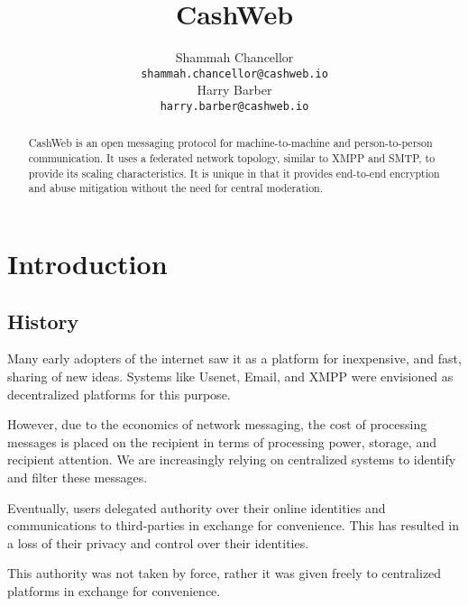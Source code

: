 \documentclass{article}
\title{CashWeb}
\author{
  Shammah Chancellor \\
  \texttt{shammah.chancellor@cashweb.io} \\
  \And
  Harry Barber \\
  \texttt{harry.barber@cashweb.io} \\
}
\theoremstyle{definition}
\begin{document}
\maketitle

\begin{abstract}
CashWeb is an open messaging protocol for machine-to-machine and person-to-person communication. It uses a federated network topology, similar to XMPP and SMTP, to provide its scaling characteristics. It is unique in that it provides end-to-end encryption and abuse mitigation without the need for central moderation.
\end{abstract}

\section{Introduction}

\subsection{History}

Many early adopters of the internet saw it as a platform for inexpensive, and fast, sharing of new ideas. Systems like Usenet\cite{rfc5536}\cite{rfc5537}, Email\cite{rfc5322}\cite{rfc1939}\cite{rfc5321}\cite{rfc4551}, and XMPP\cite{rfc3920}\cite{rfc3921}\cite{rfc3922}\cite{rfc3923} were envisioned as decentralized platforms for this purpose.


However, due to the economics of network messaging, the cost of processing messages is placed on the recipient in terms of processing power, storage, and recipient attention. We are increasingly relying on centralized systems to identify and filter these messages. 


Eventually, users delegated authority over their online identities and communications to third-parties in exchange for convenience. This has resulted in a loss of their privacy and control over their identities.


This authority was not taken by force, rather it was given freely to centralized platforms in exchange for convenience.
\end{document}
